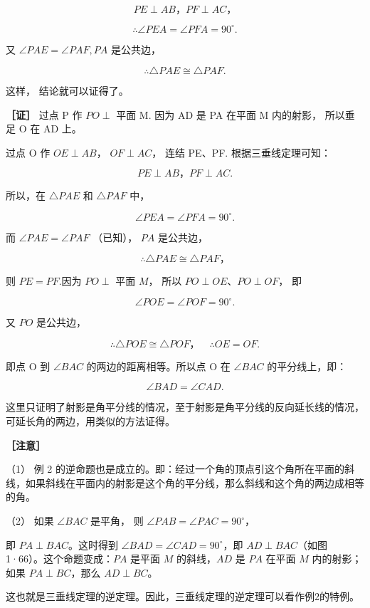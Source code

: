 \[
P E \perp A B\text{，} PF \perp AC\text{，}
\]

\[
\therefore \angle P E A = \angle P F A = 90^{\circ}.
\]

又 \(\angle PAE = \angle PAF, PA\) 是公共边，

\[
\therefore \triangle P A E \cong \triangle P A F.
\]

这样， 结论就可以证得了。

\textbf{［证］} 过点 P 作 \(PO \perp\) 平面 M. 因为 AD 是 PA 在平面 M
内的射影， 所以垂足 O 在 AD 上。

过点 O 作 \(OE \perp AB\)， \(OF \perp AC\)， 连结 PE、PF.
根据三垂线定理可知：

\[
P E \perp A B\text{，} P F \perp A C.
\]

所以，在 \(\triangle PAE\) 和 \(\triangle PAF\) 中，

\[
\angle P E A = \angle P F A = 90^{\circ}.
\]

而 \(\angle PAE = \angle PAF\) （已知）， \(PA\) 是公共边，

\[
\therefore \triangle P A E \cong \triangle P A F\text{，}
\]

则 \(PE = PF.\)因为 \(PO \perp\) 平面 \(M\)， 所以
\(PO \perp OE\)、\(PO \perp OF\)， 即

\[
\angle P O E = \angle P O F = 90^{\circ}.
\]

又 \(PO\) 是公共边，

\[
\therefore \triangle P O E \cong \triangle P O F\text{，} \quad \therefore O E = O F.
\]

即点 O 到 \(\angle BAC\) 的两边的距离相等。所以点 O 在 \(\angle BAC\)
的平分线上，即：

\[
\angle B A D = \angle C A D.
\]

这里只证明了射影是角平分线的情况，至于射影是角平分线的反向延长线的情况，可延长角的两边，用类似的方法证得。

\textbf{［注意］}

（1） 例 2
的逆命题也是成立的。即：经过一个角的顶点引这个角所在平面的斜线，如果斜线在平面内的射影是这个角的平分线，那么斜线和这个角的两边成相等的角。

（2） 如果 \(\angle BAC\) 是平角， 则
\(\angle PAB = \angle PAC = 90^{\circ}\)，

即 \(PA \perp BAC\)。这时得到 \(\angle BAD = \angle CAD = 90^\circ\)，即
\(AD \perp BAC\)（如图1·66）。这个命题变成：\(PA\) 是平面 \(M\)
的斜线，\(AD\) 是 \(PA\) 在平面 \(M\) 内的射影；如果
\(PA \perp BC\)，那么 \(AD \perp BC\)。

这也就是三垂线定理的逆定理。因此，三垂线定理的逆定理可以看作例2的特例。

